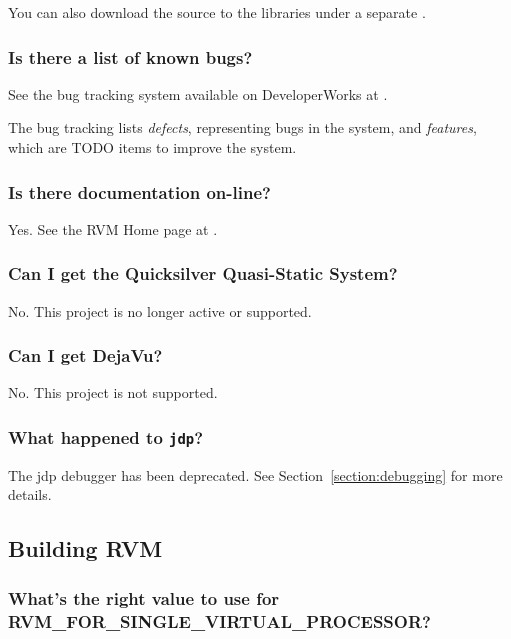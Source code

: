 You can also download the source to the libraries under
a separate 
.

\subsubsection{Is there a list of known bugs?}

See the bug tracking system available on DeveloperWorks at 
\xlink{{\tt \RVMBugURL}}{\RVMBugURL}.

The bug tracking lists {\em defects}, representing bugs in the system, and
{\em features}, which are TODO items to improve the system.

\subsubsection{Is there documentation on-line?}

Yes.  See the RVM Home page at
\xlink{{\tt \RVMHomeURL}}{\RVMHomeURL}.

\subsubsection{Can I get the Quicksilver Quasi-Static System?}

No. This project is no longer active or supported.

\subsubsection{Can I get DejaVu?}

No. This project is not supported. 

\subsubsection{What happened to {\tt jdp}?}

The jdp debugger has been deprecated.  See
Section~\ref{section:debugging} for more details.

\subsection{Building RVM}


\subsubsection{What's the right value to use for
RVM\_FOR\_SINGLE\_VIRTUAL\_PROCESSOR?} 
\label{singleProcessorQuestion}

